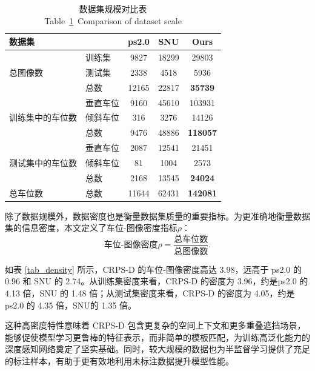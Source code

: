 \begin{table}[!h]
\centering
\setlength{\tabcolsep}{4.0mm}
\caption{数据集规模对比表 \\Table~\ref{tab_datascale}~Comparison of dataset scale}
\begin{tabular}{llccc}
        \toprule
         数据集  & & ps2.0\cite{zhang2018vision} & SNU\cite{do2020context} & Ours \\
        \midrule
             \multirow{3}{*}{总图像数} & 训练集 & 9827 & 18299 & 29803  \\
              & 测试集 & 2338 &	4518	&5936   \\
              & 总数 & 12165	& 22817	& \textbf{35739}  \\
        \midrule
            \multirow{3}{*}{训练集中的车位数}  & 垂直车位 & 9160 & 45610 & 103931  \\
              & 倾斜车位 & 316 &	3276 & 14126   \\
              & 总数 & 9476 & 48886 & \textbf{118057}  \\
        \midrule
             \multirow{3}{*}{测试集中的车位数}   & 垂直车位 & 2087 & 12541 & 21451 \\
              & 倾斜车位 & 81 & 1004 & 2573  \\
              & 总数 & 2168 & 13545 & \textbf{24024}   \\
        \midrule
             总车位数  & 总数 & 11644 & 62431 & \textbf{142081} \\
        \bottomrule
    \end{tabular}
\label{tab_datascale}
\end{table} 

除了数据规模外，数据密度也是衡量数据集质量的重要指标。为更准确地衡量数据集的信息密度，本文定义了车位-图像密度指标$\rho$：
\begin{equation}
 \mbox{车位-图像密度}\rho = \frac{\mbox{总车位数}}{\mbox{总图像数}}.
\end{equation}

如表 \ref{tab_density} 所示，CRPS-D 的车位-图像密度高达 3.98，远高于 ps2.0 的 0.96 和 SNU 的 2.74。从训练集密度来看，CRPS-D 的密度为 3.96，约是ps2.0 的 4.13 倍，SNU 的 1.48 倍；从测试集密度来看，CRPS-D 的密度为 4.05，约是 ps2.0 的 4.35 倍，SNU的 1.35 倍。

这种高密度特性意味着 CRPS-D 包含更复杂的空间上下文和更多重叠遮挡场景，能够促使模型学习更鲁棒的特征表示，而非简单的模板匹配，为训练高泛化能力的深度感知网络奠定了坚实基础。同时，较大规模的数据也为半监督学习提供了充足的标注样本，有助于更有效地利用未标注数据提升模型性能。

